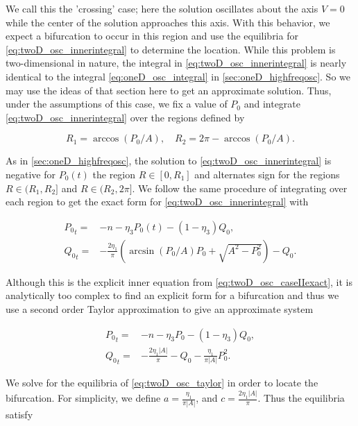 We call this the 'crossing' case; here the solution oscillates about the axis $V=0$ while the center of the solution approaches this axis. With this behavior, we expect a bifurcation to occur in this region and use the equilibria for \eqref{eq:twoD_osc_innerintegral} to determine the location. While this problem is two-dimensional in nature, the integral in \eqref{eq:twoD_osc_innerintegral} is nearly identical to the integral \eqref{eq:oneD_osc_integral} in \autoref{sec:oneD_highfreqosc}. So we may use the ideas of that section here to get an approximate solution. Thus, under the assumptions of this case, we fix a value of $P_0$ and integrate \eqref{eq:twoD_osc_innerintegral} over the regions defined by

\begin{equation*}
R_1=\arccos(P_0/A),\quad R_2=2\pi-\arccos(P_0/A).
\end{equation*}

\indent As in \autoref{sec:oneD_highfreqosc}, the solution to \eqref{eq:twoD_osc_innerintegral} is negative for $P_0(t)$ the region $R\in[0,R_1]$ and alternates sign for the regions $R\in (R_1,R_2]$ and $R\in (R_2,2\pi]$. We follow the same procedure of integrating over each region to get the exact form for \eqref{eq:twoD_osc_innerintegral} with

\begin{equation}\label{eq:twoD_osc_caseIIexact}
\begin{aligned}
{P_0}_t=&-n- \eta_3 P_0(t)-(1-\eta_3)Q_0,\\
{Q_0}_t=&-\frac{2\eta_1}{\pi}\left(\arcsin(P_0/A)P_0+\sqrt{A^2-P_0^2}\right)-Q_0.
\end{aligned}
\end{equation}

Although this is the explicit inner equation from \eqref{eq:twoD_osc_caseIIexact}, it is analytically too complex to find an explicit form for a bifurcation and thus we use a second order Taylor approximation to give an approximate system

\begin{equation}\label{eq:twoD_osc_taylor}
\begin{aligned}
{P_0}_t=&-n -\eta_3 P_0-(1-\eta_3)Q_0,\\
{Q_0}_t=&-\frac{2\eta_1|A|}{\pi}-Q_0-\frac{\eta_1}{\pi|A|}P_0^2.
\end{aligned}
\end{equation}

We solve for the equilibria of \eqref{eq:twoD_osc_taylor} in order to locate the bifurcation. For simplicity, we define $a=\frac{\eta_1}{\pi|A|}$, and $ c=\frac{2\eta_1|A|}{\pi}$. Thus the equilibria satisfy

